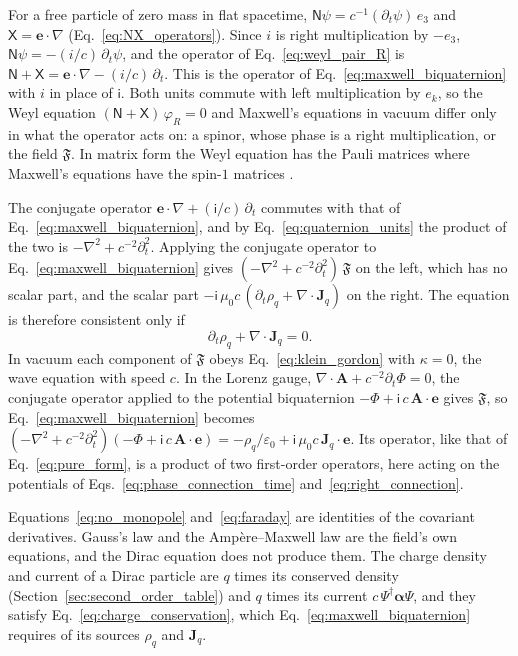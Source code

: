 \documentclass[aps,prd,onecolumn,tightenlines,nofootinbib,notitlepage,11pt,floatfix]{revtex4-2}
\theoremstyle{indentedtheorem}
\begin{document}
For a free particle of zero mass in flat spacetime, $\mathsf{N}\psi=c^{-1}(\partial_t\psi)\,e_3$ and $\mathsf{X}=\mathbf{e}\cdot\nabla$ (Eq.~\eqref{eq:NX_operators}). Since $i$ is right multiplication by $-e_3$, $\mathsf{N}\psi=-(i/c)\,\partial_t\psi$, and the operator of Eq.~\eqref{eq:weyl_pair_R} is $\mathsf{N}+\mathsf{X}=\mathbf{e}\cdot\nabla-(i/c)\,\partial_t$. This is the operator of Eq.~\eqref{eq:maxwell_biquaternion} with $i$ in place of $\mathsf{i}$. Both units commute with left multiplication by $e_k$, so the Weyl equation $(\mathsf{N}+\mathsf{X})\,\varphi_R=0$ and Maxwell's equations in vacuum differ only in what the operator acts on: a spinor, whose phase is a right multiplication, or the field $\mathfrak{F}$. In matrix form the Weyl equation has the Pauli matrices where Maxwell's equations have the spin-$1$ matrices \citep{BialynickiBirula1996Photon}.

The conjugate operator $\mathbf{e}\cdot\nabla+(\mathsf{i}/c)\,\partial_t$ commutes with that of Eq.~\eqref{eq:maxwell_biquaternion}, and by Eq.~\eqref{eq:quaternion_units} the product of the two is $-\nabla^2+c^{-2}\partial_t^2$. Applying the conjugate operator to Eq.~\eqref{eq:maxwell_biquaternion} gives $(-\nabla^2+c^{-2}\partial_t^2)\,\mathfrak{F}$ on the left, which has no scalar part, and the scalar part $-\mathsf{i}\,\mu_0c\,(\partial_t\rho_q+\nabla\cdot\mathbf{J}_q)$ on the right. The equation is therefore consistent only if
\begin{equation}
    \partial_t\rho_q+\nabla\cdot\mathbf{J}_q = 0 .
    \label{eq:charge_conservation}
\end{equation}
In vacuum each component of $\mathfrak{F}$ obeys Eq.~\eqref{eq:klein_gordon} with $\kappa=0$, the wave equation with speed $c$. In the Lorenz gauge, $\nabla\cdot\mathbf{A}+c^{-2}\partial_t\Phi=0$, the conjugate operator applied to the potential biquaternion $-\Phi+\mathsf{i}\,c\,\mathbf{A}\cdot\mathbf{e}$ gives $\mathfrak{F}$, so Eq.~\eqref{eq:maxwell_biquaternion} becomes $(-\nabla^2+c^{-2}\partial_t^2)(-\Phi+\mathsf{i}\,c\,\mathbf{A}\cdot\mathbf{e})=-\rho_q/\varepsilon_0+\mathsf{i}\,\mu_0c\,\mathbf{J}_q\cdot\mathbf{e}$. Its operator, like that of Eq.~\eqref{eq:pure_form}, is a product of two first-order operators, here acting on the potentials of Eqs.~\eqref{eq:phase_connection_time} and~\eqref{eq:right_connection}.

Equations~\eqref{eq:no_monopole} and~\eqref{eq:faraday} are identities of the covariant derivatives. Gauss's law and the Amp\`ere--Maxwell law are the field's own equations, and the Dirac equation does not produce them. The charge density and current of a Dirac particle are $q$ times its conserved density (Section~\ref{sec:second_order_table}) and $q$ times its current $c\,\Psi^\dagger\boldsymbol{\alpha}\Psi$, and they satisfy Eq.~\eqref{eq:charge_conservation}, which Eq.~\eqref{eq:maxwell_biquaternion} requires of its sources $\rho_q$ and $\mathbf{J}_q$.
\end{document}
